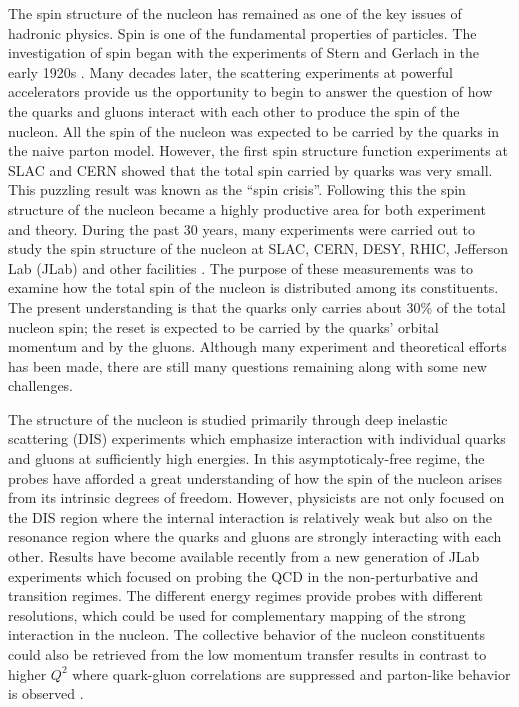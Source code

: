 The spin structure of the nucleon has remained as one of the key issues of hadronic physics. Spin is one of the fundamental properties of particles. The investigation of spin began with the experiments of Stern and Gerlach in the early 1920s \cite{Gerlach1922}. Many decades later, the scattering experiments at powerful accelerators provide us the opportunity to begin to answer the question of how the quarks and gluons interact with each other to produce the spin of the nucleon. All the spin of the nucleon was expected to be carried by the quarks in the naive parton model. However, the first spin structure function experiments at SLAC \cite{Alguard1978} and CERN \cite{Ashman1988} showed that the total spin carried by quarks was very small. This puzzling result was known as the ``spin crisis''. Following this the spin structure of the nucleon became a highly productive area for both experiment and theory. During the past 30 years, many experiments were carried out to study the spin structure of the nucleon at SLAC, CERN, DESY, RHIC, Jefferson Lab (JLab) and other facilities \cite{Kuhn2009}. The purpose of these measurements was to examine how the total spin of the nucleon is distributed among its constituents. The present understanding is that the quarks only carries about 30\% of the total nucleon spin; the reset is expected to be carried by the quarks' orbital momentum and by the gluons. Although many experiment and theoretical efforts has been made, there are still many questions remaining along with some new challenges.

The structure of the nucleon is studied primarily through deep inelastic scattering (DIS) experiments which emphasize interaction with individual quarks and gluons at sufficiently high energies. In this asymptoticaly-free regime, the probes have afforded a great understanding of how the spin of the nucleon arises from its intrinsic degrees of freedom. However, physicists are not only focused on the DIS region where the internal interaction is relatively weak but also on the resonance region where the quarks and gluons are strongly interacting with each other. Results have become available recently from a new generation of JLab experiments which focused on probing the QCD in the non-perturbative and transition regimes. The different energy regimes provide probes with different resolutions, which could be used for complementary mapping of the strong interaction in the nucleon. The collective behavior of the nucleon constituents could also be retrieved from the low momentum transfer results in contrast to higher $Q^2$ where quark-gluon correlations are suppressed and parton-like behavior is observed \cite{G2P}.

